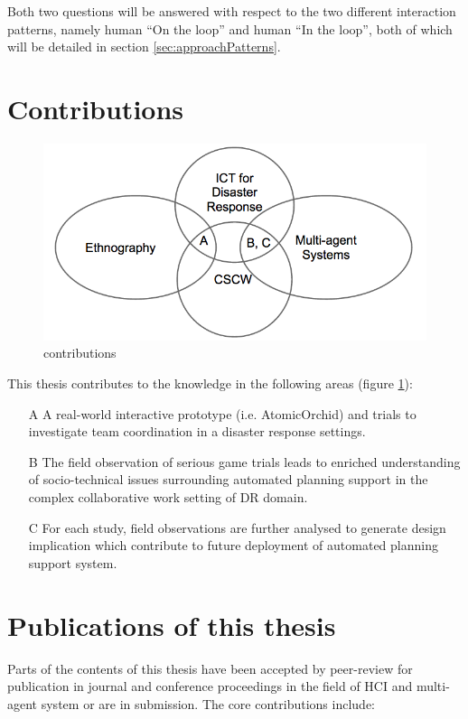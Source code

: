 Both two questions will be answered with respect to the two different interaction patterns, namely human ``On the loop'' and human ``In the loop'', both of which will be detailed in section \ref{sec:approachPatterns}. 

\section{Contributions} 
\begin{figure}[h]
  \centering
  \includegraphics[scale=0.5]{img/introduction/contributions.png}
  \caption{contributions}
  \label{fig:contributions}
\end{figure}


This thesis contributes to the knowledge in the following areas (figure \ref{fig:contributions}): \\
\begin{enumerate}
  \item[A] A real-world interactive prototype (i.e. AtomicOrchid) and trials to investigate team coordination in a disaster response settings.
  \item[B] The field observation of serious game trials leads to enriched understanding of socio-technical issues surrounding automated planning support in the complex collaborative work setting of DR domain.
  \item[C] For each study, field observations are further analysed to generate design implication which contribute to future deployment of automated planning support system. 
\end{enumerate}


\section{Publications of this thesis} 
Parts of the contents of this thesis have been accepted by peer-review for publication in journal and conference proceedings in the field of HCI and multi-agent system or are in submission. The core contributions include: \\


